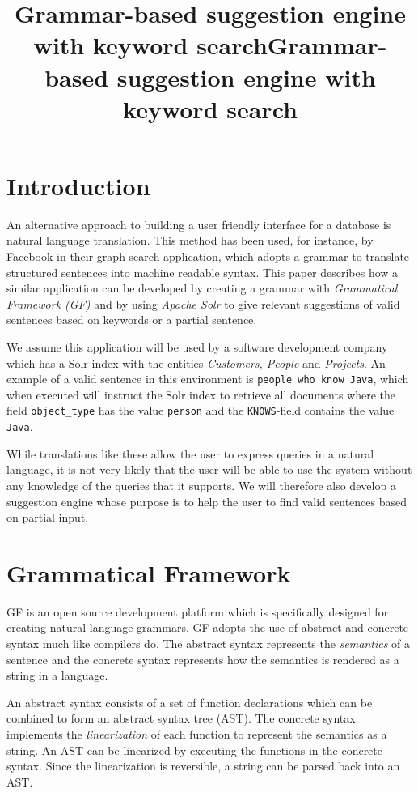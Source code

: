 \documentclass[10pt, a4paper]{article}
\title{Grammar-based suggestion engine with keyword search}
\title{Grammar-based suggestion engine with keyword search}
\begin{document}
\maketitleabstract


\section{Introduction}
An alternative approach to building a user friendly interface for 
a database is  natural language translation. This method has been used,
for instance, by Facebook \cite{li:2013} in 
their graph search application, which adopts a grammar to translate 
structured sentences into machine readable syntax. This paper describes 
how a similar application can be developed by creating a grammar 
with \emph{Grammatical Framework (GF)} \cite{ranta:2011} and 
by using \emph{Apache Solr} \cite{kuc:2011} to give relevant suggestions of valid sentences based on keywords or a partial sentence.

We assume this application will be used by a software development 
company which has a Solr index with the entities \emph{Customers, People} 
and \emph{Projects}. An example of a valid sentence in this environment is \texttt{people who know Java}, which when executed will instruct the Solr index to retrieve all documents where the field \texttt{object\_type} has the value \texttt{person} and the \texttt{KNOWS}-field contains the value \texttt{Java}. 

While translations like these allow the user to express queries in 
a natural language, it is not very likely that the user will be 
able to use the system without any knowledge of the queries that 
it supports. We will therefore also develop a suggestion engine 
whose purpose is to help the user to find valid sentences based on partial input.

\section{Grammatical Framework}
GF is an open source development platform which is specifically designed
for creating natural language grammars. GF adopts the use of abstract 
and concrete syntax much like compilers do. 
The abstract syntax represents the \emph{semantics} of a sentence and 
the concrete syntax represents how the semantics is rendered as a string
in a language. 

An abstract syntax consists of a set of function declarations 
which can be combined to form an abstract syntax tree (AST). 
The concrete syntax implements the \emph{linearization} of each function
to represent the semantics as a string. An AST can be linearized 
by executing the functions in the concrete syntax. Since the
linearization is reversible, a string can be parsed back into an AST.
\end{document}
